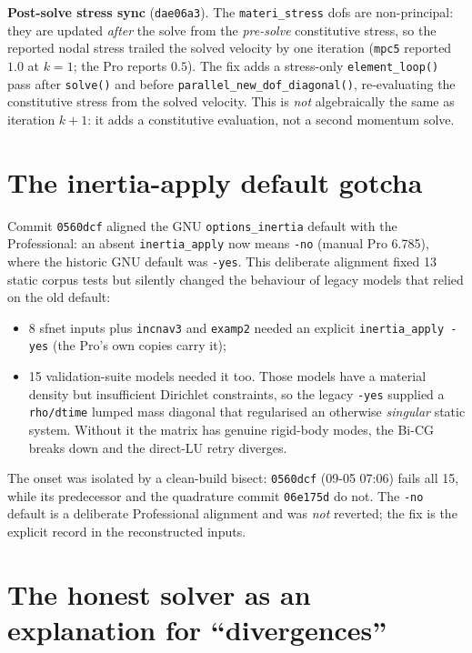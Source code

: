 \documentclass[11pt,a4paper]{report}
\newcommand{\code}[1]{\texttt{#1}}
\begin{document}
\textbf{Post-solve stress sync} (\code{dae06a3}). The \code{materi\_\allowbreak stress} dofs
are non-principal: they are updated \emph{after} the solve from the \emph{pre-solve}
constitutive stress, so the reported nodal stress trailed the solved velocity by
one iteration (\code{mpc5} reported $1.0$ at $k=1$; the Pro reports $0.5$). The
fix adds a stress-only \code{element\_\allowbreak loop()} pass after \code{solve()} and before
\code{parallel\_\allowbreak new\_\allowbreak dof\_\allowbreak diagonal()}, re-evaluating the constitutive stress from
the solved velocity. This is \emph{not} algebraically the same as iteration
$k+1$: it adds a constitutive evaluation, not a second momentum solve.

\section{The inertia-apply default gotcha}
\label{sec:inertia}

Commit \code{0560dcf} aligned the GNU \code{options\_\allowbreak inertia} default with the
Professional: an absent \code{inertia\_\allowbreak apply} now means \code{-no} (manual Pro
6.785), where the historic GNU default was \code{-yes}. This deliberate alignment
fixed 13 static corpus tests but silently changed the behaviour of legacy models
that relied on the old default:

\begin{itemize}
  \item 8 sfnet inputs plus \code{incnav3} and \code{examp2} needed an explicit
        \code{inertia\_\allowbreak apply -yes} (the Pro's own copies carry it);
  \item 15 validation-suite models needed it too. Those models have a material
        density but insufficient Dirichlet constraints, so the legacy \code{-yes}
        supplied a \code{rho/\allowbreak dtime} lumped mass diagonal that regularised an
        otherwise \emph{singular} static system. Without it the matrix has
        genuine rigid-body modes, the Bi-CG breaks down and the direct-LU retry
        diverges.
\end{itemize}

The onset was isolated by a clean-build bisect: \code{0560dcf} (09-05 07:06)
fails all 15, while its predecessor and the quadrature commit \code{06e175d} do
not. The \code{-no} default is a deliberate Professional alignment and was
\emph{not} reverted; the fix is the explicit record in the reconstructed inputs.

\section{The honest solver as an explanation for ``divergences''}
\label{sec:honest-solver}
\end{document}
